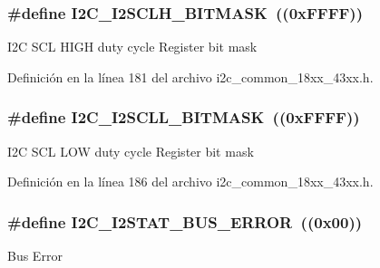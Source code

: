 \subsubsection[{\texorpdfstring{I2\+C\+\_\+\+I2\+S\+C\+L\+H\+\_\+\+B\+I\+T\+M\+A\+SK}{I2C_I2SCLH_BITMASK}}]{\setlength{\rightskip}{0pt plus 5cm}\#define I2\+C\+\_\+\+I2\+S\+C\+L\+H\+\_\+\+B\+I\+T\+M\+A\+SK~((0x\+F\+F\+F\+F))}\hypertarget{group___i2_c__18_x_x__43_x_x_gad6a9a202cf4d30607475338f7b59968a}{}\label{group___i2_c__18_x_x__43_x_x_gad6a9a202cf4d30607475338f7b59968a}
I2C S\+CL H\+I\+GH duty cycle Register bit mask 

Definición en la línea 181 del archivo i2c\+\_\+common\+\_\+18xx\+\_\+43xx.\+h.

\subsubsection[{\texorpdfstring{I2\+C\+\_\+\+I2\+S\+C\+L\+L\+\_\+\+B\+I\+T\+M\+A\+SK}{I2C_I2SCLL_BITMASK}}]{\setlength{\rightskip}{0pt plus 5cm}\#define I2\+C\+\_\+\+I2\+S\+C\+L\+L\+\_\+\+B\+I\+T\+M\+A\+SK~((0x\+F\+F\+F\+F))}\hypertarget{group___i2_c__18_x_x__43_x_x_gadf54076e458f10fc00be5ed9504bc930}{}\label{group___i2_c__18_x_x__43_x_x_gadf54076e458f10fc00be5ed9504bc930}
I2C S\+CL L\+OW duty cycle Register bit mask 

Definición en la línea 186 del archivo i2c\+\_\+common\+\_\+18xx\+\_\+43xx.\+h.

\subsubsection[{\texorpdfstring{I2\+C\+\_\+\+I2\+S\+T\+A\+T\+\_\+\+B\+U\+S\+\_\+\+E\+R\+R\+OR}{I2C_I2STAT_BUS_ERROR}}]{\setlength{\rightskip}{0pt plus 5cm}\#define I2\+C\+\_\+\+I2\+S\+T\+A\+T\+\_\+\+B\+U\+S\+\_\+\+E\+R\+R\+OR~((0x00))}\hypertarget{group___i2_c__18_x_x__43_x_x_ga7c1e7f0f166cdc547263229c5ce07cb0}{}\label{group___i2_c__18_x_x__43_x_x_ga7c1e7f0f166cdc547263229c5ce07cb0}
Bus Error 

